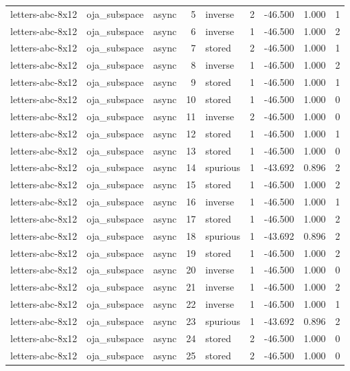 \begin{tabular}{lllrlrrrr}
letters-abc-8x12 & oja\_subspace & async & 5 & inverse & 2 & -46.500 & 1.000 & 1 \\
letters-abc-8x12 & oja\_subspace & async & 6 & inverse & 1 & -46.500 & 1.000 & 2 \\
letters-abc-8x12 & oja\_subspace & async & 7 & stored & 2 & -46.500 & 1.000 & 1 \\
letters-abc-8x12 & oja\_subspace & async & 8 & inverse & 1 & -46.500 & 1.000 & 2 \\
letters-abc-8x12 & oja\_subspace & async & 9 & stored & 1 & -46.500 & 1.000 & 1 \\
letters-abc-8x12 & oja\_subspace & async & 10 & stored & 1 & -46.500 & 1.000 & 0 \\
letters-abc-8x12 & oja\_subspace & async & 11 & inverse & 2 & -46.500 & 1.000 & 0 \\
letters-abc-8x12 & oja\_subspace & async & 12 & stored & 1 & -46.500 & 1.000 & 1 \\
letters-abc-8x12 & oja\_subspace & async & 13 & stored & 1 & -46.500 & 1.000 & 0 \\
letters-abc-8x12 & oja\_subspace & async & 14 & spurious & 1 & -43.692 & 0.896 & 2 \\
letters-abc-8x12 & oja\_subspace & async & 15 & stored & 1 & -46.500 & 1.000 & 2 \\
letters-abc-8x12 & oja\_subspace & async & 16 & inverse & 1 & -46.500 & 1.000 & 1 \\
letters-abc-8x12 & oja\_subspace & async & 17 & stored & 1 & -46.500 & 1.000 & 2 \\
letters-abc-8x12 & oja\_subspace & async & 18 & spurious & 1 & -43.692 & 0.896 & 2 \\
letters-abc-8x12 & oja\_subspace & async & 19 & stored & 1 & -46.500 & 1.000 & 2 \\
letters-abc-8x12 & oja\_subspace & async & 20 & inverse & 1 & -46.500 & 1.000 & 0 \\
letters-abc-8x12 & oja\_subspace & async & 21 & inverse & 1 & -46.500 & 1.000 & 2 \\
letters-abc-8x12 & oja\_subspace & async & 22 & inverse & 1 & -46.500 & 1.000 & 1 \\
letters-abc-8x12 & oja\_subspace & async & 23 & spurious & 1 & -43.692 & 0.896 & 2 \\
letters-abc-8x12 & oja\_subspace & async & 24 & stored & 2 & -46.500 & 1.000 & 0 \\
letters-abc-8x12 & oja\_subspace & async & 25 & stored & 2 & -46.500 & 1.000 & 0 \\

\end{tabular}
